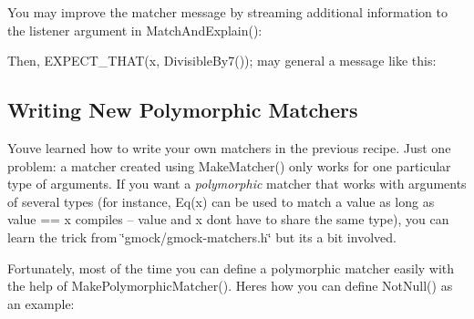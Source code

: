 You may improve the matcher message by streaming additional information to the {\ttfamily listener} argument in {\ttfamily Match\+And\+Explain()}\+:


\begin{DoxyCode}{0}
\DoxyCodeLine{    \}}
\DoxyCodeLine{  \}}
\DoxyCodeLine{\};}
\end{DoxyCode}


Then, {\ttfamily E\+X\+P\+E\+C\+T\+\_\+\+T\+H\+A\+T(x, Divisible\+By7());} may general a message like this\+: 
\begin{DoxyCode}{0}
\end{DoxyCode}


\subsection*{Writing New Polymorphic Matchers}

You\textquotesingle{}ve learned how to write your own matchers in the previous recipe. Just one problem\+: a matcher created using {\ttfamily Make\+Matcher()} only works for one particular type of arguments. If you want a {\itshape polymorphic} matcher that works with arguments of several types (for instance, {\ttfamily Eq(x)} can be used to match a {\ttfamily value} as long as {\ttfamily value} == {\ttfamily x} compiles -- {\ttfamily value} and {\ttfamily x} don\textquotesingle{}t have to share the same type), you can learn the trick from {\ttfamily \char`\"{}gmock/gmock-\/matchers.\+h\char`\"{}} but it\textquotesingle{}s a bit involved.

Fortunately, most of the time you can define a polymorphic matcher easily with the help of {\ttfamily Make\+Polymorphic\+Matcher()}. Here\textquotesingle{}s how you can define {\ttfamily Not\+Null()} as an example\+:


